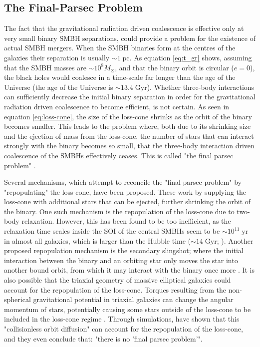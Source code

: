 \documentclass[english, oneside]{HYgradu}
\begin{document}
\subsection{The Final-Parsec Problem}

The fact that the gravitational radiation driven coalescence is effective only at very small binary SMBH separations, could provide a problem for the existence of actual SMBH mergers. When the SMBH binaries form at the centres of the galaxies their separation is usually $\sim 1 \; \mathrm{pc}$. As equation \ref{eq:t_gr} shows, assuming that the SMBH masses are $\sim 10^8 M_\odot$, and that the binary orbit is circular ($e = 0$), the black holes would coalesce in a time-scale far longer than the age of the Universe (the age of the Universe is $\sim 13.4 \; \mathrm{Gyr}$). Whether three-body interactions can sufficiently decrease the initial binary separation in order for the gravitational radiation driven coalescence to become efficient, is not certain. As seen in equation \ref{eq:loss-cone}, the size of the loss-cone shrinks as the orbit of the binary becomes smaller. This leads to the problem where, both due to its shrinking size and the ejection of mass from the loss-cone, the number of stars that can interact strongly with the binary becomes so small, that the three-body interaction driven coalescence of the SMBHs effectively ceases. This is called "the final parsec problem" \citep{Milosavljevic2003}.

Several mechanisms, which attempt to reconcile the "final parsec problem" by "repopulating" the loss-cone, have been proposed. These work by supplying the loss-cone with additional stars that can be ejected, further shrinking the orbit of the binary. One such mechanism is the repopulation of the loss-cone due to two-body relaxation. However, this has been found to be too inefficient, as the relaxation time scales inside the SOI of the central SMBHs seem to be $\sim 10^{11} \; \mathrm{yr}$ in almost all galaxies, which is larger than the Hubble time ($\sim 14 \; \mathrm{Gyr}$; \citealt{Faber1997, Milosavljevic2001}). Another proposed repopulation mechanism is the secondary slingshot; where the initial interaction between the binary and an orbiting star only moves the star into another bound orbit, from which it may interact with the binary once more \citep{MerrittBook}. It is also possible that the triaxial geometry of massive elliptical galaxies could account for the repopulation of the loss-cone. Torques resulting from the non-spherical gravitational potential in triaxial galaxies can change the angular momentum of stars, potentially causing some stars outside of the loss-cone to be included in the loss-cone regime \citep{MerrittBook, Gualandris2017}. Through simulations, \cite{Gualandris2017} have shown that this "collisionless orbit diffusion" can account for the repopulation of the loss-cone, and they even conclude that: "there is no 'final parsec problem'".
\end{document}

